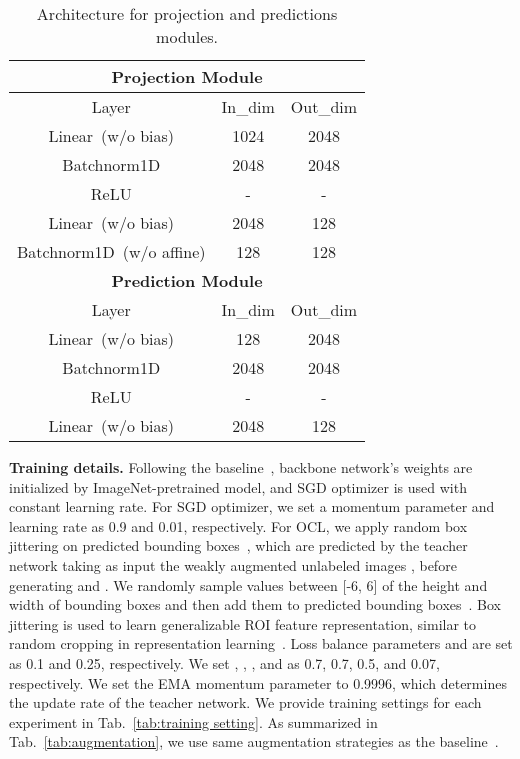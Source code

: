 \documentclass{bmvc2k}
\begin{document}
\begin{table}[h]
    \centering
    \scriptsize
    \begin{tabular}{c|c|c}
    \toprule
    \multicolumn{3}{c}{\textbf{Projection Module}} \\
    \toprule
    Layer & In\_dim & Out\_dim\\
    \midrule
    Linear~(w/o bias) & 1024 & 2048 \\
    Batchnorm1D & 2048 & 2048 \\
    ReLU & - & - \\
    Linear~(w/o bias) & 2048 & 128 \\
    Batchnorm1D~(w/o affine) & 128 & 128 \\
    \toprule
    \multicolumn{3}{c}{\textbf{Prediction Module}} \\
    \toprule
    Layer & In\_dim & Out\_dim \\
    \midrule
    Linear~(w/o bias) & 128 & 2048 \\
    Batchnorm1D & 2048 & 2048 \\
    ReLU & - & - \\
    Linear~(w/o bias) & 2048 & 128 \\
    \bottomrule
    \end{tabular}
    \caption{Architecture for projection and predictions modules.}
    \label{tab:arch_module}
\end{table}

\noindent\textbf{Training details.}
Following the baseline~\cite{liu2021unbiased}, backbone network's weights are initialized by ImageNet-pretrained model, and SGD optimizer is used with constant learning rate. For SGD optimizer, we set a momentum parameter and learning rate as 0.9 and 0.01, respectively. For OCL, we apply random box jittering on predicted bounding boxes~, which are predicted by the teacher network taking as input the weakly augmented unlabeled images , before generating  and . We randomly sample values between [-6, 6] of the height and width of bounding boxes and then add them to predicted bounding boxes~. Box jittering is used to learn generalizable ROI feature representation, similar to random cropping in representation learning~\cite{simclr}. Loss balance parameters  and  are set as 0.1 and 0.25, respectively. We set , , , and   as 0.7, 0.7, 0.5, and 0.07, respectively. We set the EMA momentum parameter to 0.9996, which determines the update rate of the teacher network. We provide training settings for each experiment in Tab.~\ref{tab:training setting}. As summarized in Tab.~\ref{tab:augmentation}, we use same augmentation strategies as the baseline~\cite{liu2021unbiased}.
\\
\end{document}
